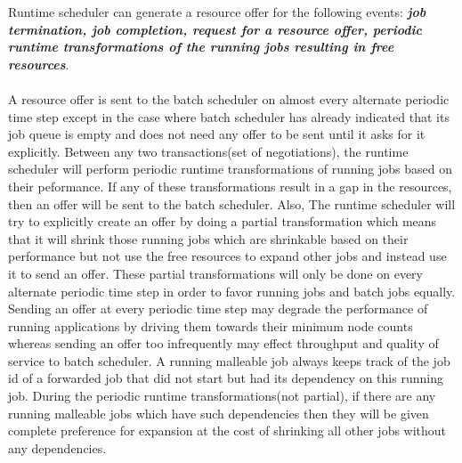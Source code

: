 Runtime scheduler can generate a resource offer for the following events: \textbf{\textit{job termination, job completion, request for a resource offer, periodic runtime transformations of the running jobs resulting in free resources}}.\\ \\
A resource offer is sent to the batch scheduler on almost every alternate periodic time step except in the case where batch scheduler has already indicated that its job queue is empty and does not need any offer to be sent until it asks for it explicitly. Between any two transactions(set of negotiations), the runtime scheduler will perform periodic runtime transformations of running jobs based on their peformance. If any of these transformations result in a gap in the resources, then an offer will be sent to the batch scheduler. Also, The runtime scheduler will try to explicitly create an offer by doing a partial transformation which means that it will shrink those running jobs which are shrinkable based on their performance but not use the free resources to expand other jobs and instead use it to send an offer. These partial transformations will only be done on every alternate periodic time step in order to favor running jobs and batch jobs equally. Sending an offer at every periodic time step may degrade the performance of running applications by driving them towards their minimum node counts whereas sending an offer too infrequently may effect throughput and quality of service to batch scheduler. A running malleable job always keeps track of the job id of a forwarded job that did not start but had its dependency on this running job. During the periodic runtime transformations(not partial), if there are any running malleable jobs which have such dependencies then they will be given complete preference for expansion at the cost of shrinking all other jobs without any dependencies.
\clearpage
\setcounter{AlgoLine}{0}
